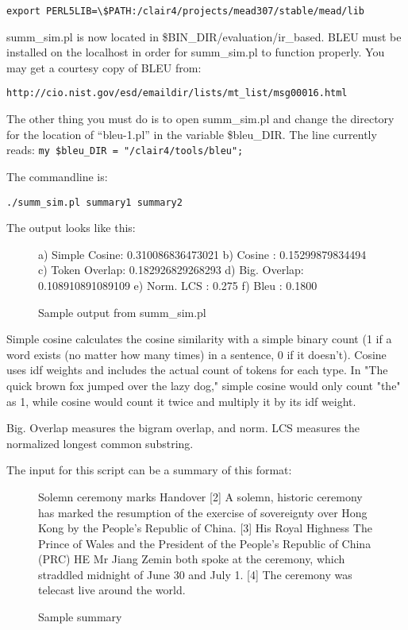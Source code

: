 \documentclass[10pt]{article}
\begin{document}
\begin{verbatim}
export PERL5LIB=\$PATH:/clair4/projects/mead307/stable/mead/lib
\end{verbatim}

summ\_sim.pl is now located in \$BIN\_DIR/evaluation/ir\_based.
BLEU must be installed on the localhost in order for summ\_sim.pl to function properly.
You may get a courtesy copy of BLEU from:
\begin{verbatim}
http://cio.nist.gov/esd/emaildir/lists/mt_list/msg00016.html 
\end{verbatim} 
The other thing you must do is to open summ\_sim.pl and change the 
directory for the location of ``bleu-1.pl'' in the variable \$bleu\_DIR.
The line currently reads: {\tt my \$bleu\_DIR = "/clair4/tools/bleu";}  

The commandline is: 
\begin{verbatim}
./summ_sim.pl summary1 summary2
\end{verbatim}

The output looks like this:

\begin{figure}[htp!]
\centering
\begin{boxedverbatim}
a) Simple Cosine: 0.310086836473021
b) Cosine       : 0.15299879834494
c) Token Overlap: 0.182926829268293
d) Big.  Overlap: 0.108910891089109
e) Norm. LCS    : 0.275
f) Bleu         : 0.1800
\end{boxedverbatim}
\caption{Sample output from summ\_sim.pl}
\label{figure:summsim.pl}
\end{figure}

Simple cosine calculates the cosine similarity with a simple binary count (1 if a word
exists (no matter how many times) in a sentence, 0 if it doesn't).  Cosine uses idf
weights and includes the actual count of tokens for each type.
In "The quick brown fox jumped over the lazy dog," simple cosine would only count "the"  
as 1, while cosine would count it twice and multiply it by its idf weight.

Big. Overlap measures the bigram overlap, and norm. LCS measures the normalized longest 
common substring.

The input for this script can be a summary of this format:

\begin{figure}[htp!]
\centering
\begin{boxedverbatim}
[1]  Solemn ceremony marks Handover
[2]  A solemn, historic ceremony has marked the resumption of the exercise 
of sovereignty over Hong Kong by the People's Republic of China.
[3]  His Royal Highness The Prince of Wales and the President of the 
People's Republic of China (PRC) HE Mr Jiang Zemin both spoke at the 
ceremony, which straddled midnight of June 30 and July 1.
[4]  The ceremony was telecast live around the world.
\end{boxedverbatim}
\caption{Sample summary}
\label{figure:summary}
\end{figure}
\end{document}
